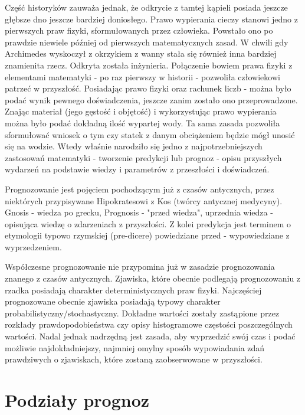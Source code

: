 \documentclass[10pt,a4paper]{book}
\begin{document}
Część historyków\citep{netz2007kodeks} zauważa jednak, że odkrycie z tamtej kąpieli posiada jeszcze głębsze dno jeszcze bardziej doniosłego. Prawo wypierania cieczy stanowi jedno z pierwszych praw fizyki, sformułowanych przez człowieka. Powstało ono po prawdzie niewiele później od pierwszych matematycznych zasad. W chwili gdy Archimedes wyskoczył z okrzykiem z wanny stała się również inna bardziej znamienita rzecz. Odkryta została inżynieria. Połączenie bowiem prawa fizyki z elementami matematyki - po raz pierwszy w historii - pozwoliła człowiekowi patrzeć w przyszłość. Posiadając prawo fizyki oraz rachunek liczb - można było podać wynik pewnego doświadczenia, jeszcze zanim zostało ono przeprowadzone. Znając materiał (jego gęstość i objętość) i wykorzystując prawo wypierania można było podać dokładną ilość wypartej wody. Ta sama zasada pozwoliła sformułować wniosek o tym czy statek z danym obciążeniem będzie mógł unosić się na wodzie. Wtedy właśnie narodziło się jedno z najpotrzebniejszych zastosowań matematyki - tworzenie predykcji lub prognoz - opisu przyszłych wydarzeń na podstawie wiedzy i parametrów z przeszłości i doświadczeń.  

Prognozowanie jest pojęciem pochodzącym już z czasów antycznych, przez niektórych przypisywane Hipokratesowi z Kos (twórcy antycznej medycyny). Gnosis - wiedza po grecku, Prognosis - "przed wiedza", uprzednia wiedza - opisująca wiedzę o zdarzeniach z przyszłości. Z kolei predykcja jest terminem o etymologii typowo rzymskiej (pre-dicere) powiedziane przed - wypowiedziane z wyprzedzeniem.

Współczesne prognozowanie nie przypomina już w zasadzie prognozowania znanego z czasów antycznych. Zjawiska, które obecnie podlegają prognozowaniu z rzadka posiadają charakter deterministycznych praw fizyki. Najczęściej prognozowane obecnie zjawiska posiadają typowy charakter probabilistyczny/stochastyczny. Dokładne wartości zostały zastąpione przez rozkłady prawdopodobieństwa czy opisy histogramowe częstości poszczególnych wartości. Nadal jednak nadrzędną jest zasada, aby wyprzedzić swój czas i podać możliwie najdokładniejszy, najmniej omylny sposób wypowiadania zdań prawdziwych o zjawiskach, które zostaną zaobserwowane w przyszłości.

\section{Podziały prognoz}
\end{document}
